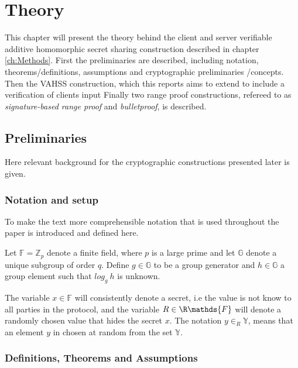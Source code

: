 \chapter{Theory}
\label{ch:theory}
This chapter will present the theory behind the client and server verifiable additive homomorphic secret sharing construction described in chapter \ref{ch:Methods}.  First  the preliminaries are described, including notation, theorems/definitions, assumptions  and cryptographic preliminaries /concepts. Then the VAHSS \cite{SumItUp} \cite{VAHSS} construction, which this reports aims to extend to include  a verification of clients input   Finally two  range proof constructions, refereed to as \textit{signature-based range proof} and \textit{bulletproof}, is described. 


\section{Preliminaries}
Here relevant background for the cryptographic constructions presented later is given. 
\subsection*{Notation and setup}
To make the text more comprehensible notation that is used throughout the paper is introduced and defined here.  



Let $\mathds{F}=\mathds{Z}_p$ denote a finite field, where $p$ is a large prime and let $\mathds{G}$ denote a unique subgroup of order $q$.  Define $g\in\mathds{G}$ to be a group generator and $h\in\mathds{G}$ a group element such that  $log_g\:h$ is unknown. 

The variable $x\in\mathds{F}$ will consistently denote a secret, i.e the value is not know to all parties in the protocol, and the variable $R\in\R\mathds{F}$ will denote a randomly chosen value that hides the secret $x$. The notation $y\in_R\mathds{Y}$, means that an element $y$ in chosen at random from the set $\mathds{Y}$.

\subsection*{Definitions, Theorems and Assumptions}

